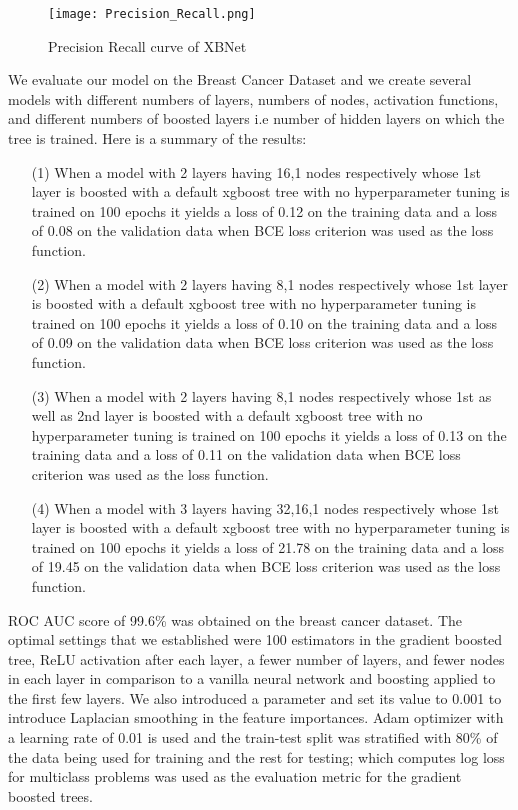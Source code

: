 \documentclass[review]{elsarticle}
\begin{document}
\begin{figure*}[ht!]
\centerline{\texttt{[image: Precision\_Recall.png]}}
\caption{Precision Recall curve of XBNet}    
  \label{fig:acc}
\end{figure*}
We evaluate our model on the Breast Cancer Dataset and we create several models with different numbers of layers, numbers of nodes, activation functions, and different numbers of boosted layers i.e number of hidden layers on which the tree is trained. Here is a summary of the results:
\begin{enumerate}
\item[(1)] When a model with 2 layers having 16,1 nodes respectively whose 1st layer is boosted with a default xgboost tree with no hyperparameter tuning is trained on 100 epochs it yields a loss of 0.12 on the training data and a loss of 0.08 on the validation data when BCE loss criterion was used as the loss function.
\item[(2)] When a model with 2 layers having 8,1 nodes respectively whose 1st layer is boosted with a default xgboost tree with no hyperparameter tuning is trained on 100 epochs it yields a loss of 0.10 on the training data and a loss of 0.09 on the validation data when BCE loss criterion was used as the loss function.
\item[(3)] When a model with 2 layers having 8,1 nodes respectively whose 1st as well as 2nd layer is boosted with a default xgboost tree with no hyperparameter tuning is trained on 100 epochs it yields a loss of 0.13 on the training data and a loss of 0.11 on the validation data when BCE loss criterion was used as the loss function.
\item[(4)] When a model with 3 layers having 32,16,1 nodes respectively whose 1st layer is boosted with a default xgboost tree with no hyperparameter tuning is trained on 100 epochs it yields a loss of 21.78 on the training data and a loss of 19.45 on the validation data when BCE loss criterion was used as the loss function.\\

\end{enumerate}

ROC AUC score of 99.6\% was obtained on the breast cancer dataset.
The optimal settings that we established were 100 estimators in the gradient boosted tree, ReLU activation after each layer, a fewer number of layers, and fewer nodes in each layer in comparison to a vanilla neural network and boosting applied to the first few layers. We also introduced a parameter  and set its value to 0.001 to introduce Laplacian smoothing in the feature importances. Adam optimizer with a learning rate of 0.01 is used and the train-test split was stratified with 80\% of the data being used for training and the rest for testing;  which computes log loss for multiclass problems was used as the evaluation metric for the gradient boosted trees.
\\
\end{document}

